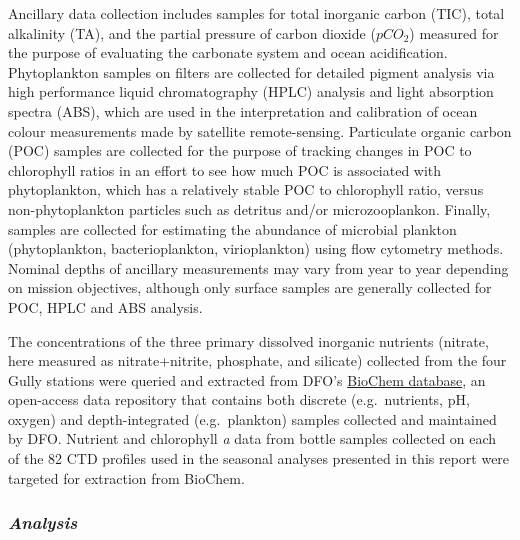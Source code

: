 \documentclass[12pt]{article}\usepackage[]{graphicx}\usepackage[]{color}
\begin{document}
Ancillary data collection includes samples for total inorganic carbon (TIC), total alkalinity (TA), and the partial pressure of carbon dioxide (\(pCO_2\)) measured for the purpose of evaluating the carbonate system and ocean acidification. Phytoplankton samples on filters are collected for detailed pigment analysis via high performance liquid chromatography (HPLC) analysis and light absorption spectra (ABS), which are used in the interpretation and calibration of ocean colour measurements made by satellite remote-sensing. Particulate organic carbon (POC) samples are collected for the purpose of tracking changes in POC to chlorophyll ratios in an effort to see how much POC is associated with phytoplankton, which has a relatively stable POC to chlorophyll ratio, versus non-phytoplankton particles such as detritus and/or microzooplankon. Finally, samples are collected for estimating the abundance of microbial plankton (phytoplankton, bacterioplankton, virioplankton) using flow cytometry methods. Nominal depths of ancillary measurements may vary from year to year depending on mission objectives, although only surface samples are generally collected for POC, HPLC and ABS analysis.

The concentrations of the three primary dissolved inorganic nutrients (nitrate, here measured as nitrate+nitrite, phosphate, and silicate) collected from the four Gully stations were queried and extracted from DFO's \href{https://www.dfo-mpo.gc.ca/science/data-donnees/biochem/index-eng.html}{BioChem database}, an open-access data repository that contains both discrete (e.g.~nutrients, pH, oxygen) and depth-integrated (e.g.~plankton) samples collected and maintained by DFO. Nutrient and chlorophyll \emph{a} data from bottle samples collected on each of the 82 CTD profiles used in the seasonal analyses presented in this report were targeted for extraction from BioChem.

\hypertarget{analysis-1}{%
\subsubsection{\texorpdfstring{\emph{Analysis}}{Analysis}}\label{analysis-1}}
\end{document}
